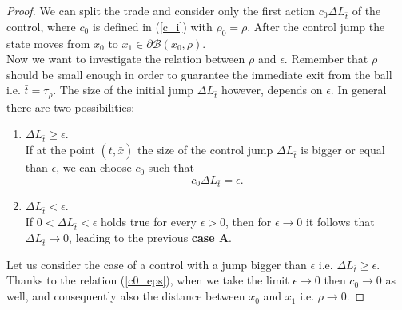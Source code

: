 \begin{proof}
We can split the trade and consider only the first action $c_0 \Delta L_{\bar t}$ of the control, where $c_0$ is defined in (\ref{c_i}) with $\rho_0 = \rho$.
After the control jump the state moves from $x_0$ to 
$x_1 \in \partial \mathcal{B}(x_0, \rho)$.\\
Now we want to investigate the relation between $\rho$ and $\epsilon$. Remember that $\rho$ should be small enough in order to guarantee the immediate 
exit from the ball i.e. $\bar t = \tau_{\rho}$. The size of the initial jump $\Delta L_{\bar t}$ however, depends on $\epsilon$.   
In general there are two possibilities:
\begin{enumerate}
 \item $\Delta L_{\bar t} \geq \epsilon$. \\
 If at the point $(\bar t, \bar x)$ the size of the control jump $\Delta L_{\bar t}$ is bigger or equal than $\epsilon$, we can choose $c_0$ such that
 \begin{equation}\label{c0_eps} 
  c_0 \Delta L_{\bar t} = \epsilon.
 \end{equation}
\item $\Delta L_{\bar t} < \epsilon$. \\
  If $0 < \Delta L_{\bar t} < \epsilon$ holds true for every $\epsilon>0$, then for $\epsilon \to 0$ it follows that $\Delta L_{\bar t} \to 0$,  
  leading to the previous \textbf{case A}.
\end{enumerate}
Let us consider the case of a control with a jump bigger than $\epsilon$ i.e. $\Delta L_{\bar t} \geq \epsilon$. 
Thanks to the relation (\ref{c0_eps}), when we take the limit $\epsilon \to 0$ then $c_0 \to 0$ as well, and consequently also the distance between $x_0$ and $x_1$ i.e. 
$\rho \to 0$.


\end{proof}

